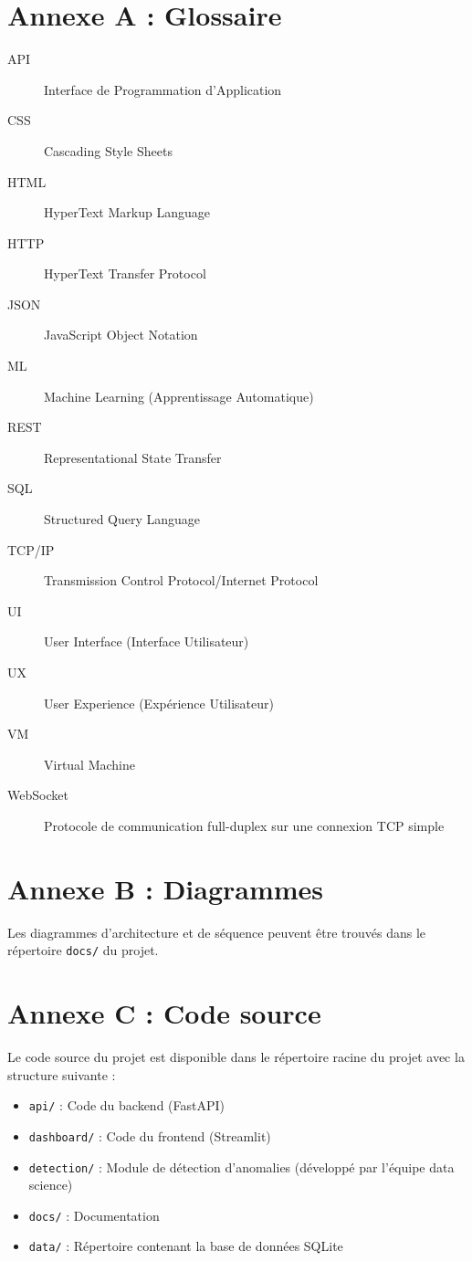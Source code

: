 \documentclass[12pt,a4paper]{report}
\begin{document}
\section{Annexe A : Glossaire}
\begin{description}
    \item[API] Interface de Programmation d'Application
    \item[CSS] Cascading Style Sheets
    \item[HTML] HyperText Markup Language
    \item[HTTP] HyperText Transfer Protocol
    \item[JSON] JavaScript Object Notation
    \item[ML] Machine Learning (Apprentissage Automatique)
    \item[REST] Representational State Transfer
    \item[SQL] Structured Query Language
    \item[TCP/IP] Transmission Control Protocol/Internet Protocol
    \item[UI] User Interface (Interface Utilisateur)
    \item[UX] User Experience (Expérience Utilisateur)
    \item[VM] Virtual Machine
    \item[WebSocket] Protocole de communication full-duplex sur une connexion TCP simple
\end{description}

\section{Annexe B : Diagrammes}
Les diagrammes d'architecture et de séquence peuvent être trouvés dans le répertoire \texttt{docs/} du projet.

\section{Annexe C : Code source}
Le code source du projet est disponible dans le répertoire racine du projet avec la structure suivante :
\begin{itemize}
    \item \texttt{api/} : Code du backend (FastAPI)
    \item \texttt{dashboard/} : Code du frontend (Streamlit)
    \item \texttt{detection/} : Module de détection d'anomalies (développé par l'équipe data science)
    \item \texttt{docs/} : Documentation
    \item \texttt{data/} : Répertoire contenant la base de données SQLite
\end{itemize}
\end{document}
